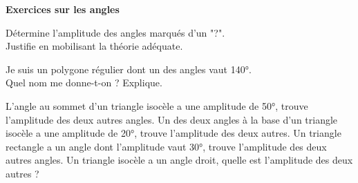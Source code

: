 \documentclass[DIV=15,12pt, parskip=half-]{scrartcl}
\begin{document}
\begin{Huge}
    \bfseries
    Exercices sur les angles
\end{Huge}
\begin{exercise}
    Détermine l'amplitude des angles marqués d'un "?".\\
    Justifie en mobilisant la théorie adéquate.

        \autonum
        \hfil
        \autonum

        \autonum
        \hfil
        \autonum

        \autonum
        \hfil
        \autonum

        \autonum
        \hfil
        \autonum
\end{exercise}

\begin{exercise}
\end{exercise}

\begin{exercise}
    Je suis un polygone régulier dont un des angles vaut \ang{140}.\\
    Quel nom me donne-t-on ? Explique.
\end{exercise}

\begin{exercise}
    \begin{tasks}
        \task L'angle au sommet d'un triangle isocèle a
        une amplitude de \ang{50}, trouve l'amplitude des deux
        autres angles.
        \task Un des deux angles à la base d'un triangle isocèle a
        une amplitude de \ang{20}, trouve l'amplitude des deux
        autres.
        \task Un triangle rectangle a un angle dont l'amplitude
        vaut \ang{30}, trouve l'amplitude des deux autres angles.
        \task Un triangle isocèle a un angle droit, quelle est
        l'amplitude des deux autres ?
    \end{tasks}
\end{exercise}
\end{document}
